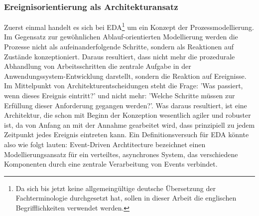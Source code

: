\subsubsection*{Ereignisorientierung als Architekturansatz}
Zuerst einmal handelt es sich bei \ac{EDA}\footnote{Da sich bis jetzt keine allgemeingültige deutsche Übersetzung der Fachterminologie durchgesetzt hat, sollen in dieser Arbeit die englischen Begrifflichkeiten verwendet werden.} um ein Konzept der Prozessmodellierung. Im Gegensatz zur gewöhnlichen Ablauf-orientierten Modellierung werden die Prozesse nicht als aufeinanderfolgende Schritte, sondern als Reaktionen auf Zustände konzeptioniert. Daraus resultiert, dass nicht mehr die prozedurale Abhandlung von Arbeitsschritten die zentrale Aufgabe in der Anwendungssystem-Entwicklung darstellt, sondern die Reaktion auf Ereignisse. Im Mittelpunkt von Architekturentscheidungen steht die Frage: 'Was passiert, wenn dieses Ereignis eintritt?' und nicht mehr: 'Welche Schritte müssen zur Erfüllung dieser Anforderung gegangen werden?'. Was daraus resultiert, ist eine Architektur, die schon mit Beginn der Konzeption wesentlich agiler und robuster ist, da von Anfang an mit der Annahme gearbeitet wird, dass prinzipiell zu jedem Zeitpunkt jedes Ereignis eintreten kann.\cite[Vgl.][S.30]{EDA2010}
Ein Definitionsversuch für \ac{EDA} könnte also wie folgt lauten: Event-Driven Archtitecture bezeichnet einen Modellierungsansatz für ein verteiltes, asynchrones System, das verschiedene Komponenten durch eine zentrale Verarbeitung von Events verbindet.\cite[Vgl.][S. 248]{CLOUD2021}
